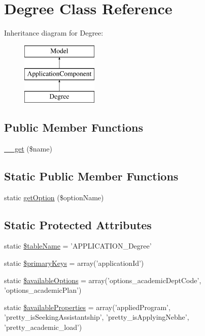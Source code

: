 \hypertarget{class_degree}{\section{Degree Class Reference}
\label{class_degree}
}
Inheritance diagram for Degree\-:\begin{figure}[H]
\begin{center}
\leavevmode
\includegraphics[height=3.000000cm]{class_degree}
\end{center}
\end{figure}
\subsection*{Public Member Functions}
\begin{DoxyCompactItemize}
\item 
\hyperlink{class_degree_af1fa5dd7922d150a2b2a7838c13f507b}{\-\_\-\-\_\-get} (\$name)
\end{DoxyCompactItemize}
\subsection*{Static Public Member Functions}
\begin{DoxyCompactItemize}
\item 
static \hyperlink{class_degree_aec479498d9a728b73ada48a7f0ceee50}{get\-Option} (\$option\-Name)
\end{DoxyCompactItemize}
\subsection*{Static Protected Attributes}
\begin{DoxyCompactItemize}
\item 
static \hyperlink{class_degree_a0b4cb9c53a0caf30457996db3ff090d0}{\$table\-Name} = 'A\-P\-P\-L\-I\-C\-A\-T\-I\-O\-N\-\_\-\-Degree'
\item 
static \hyperlink{class_degree_a81827ba2c94da59780aef2a3f713f065}{\$primary\-Keys} = array('application\-Id')
\item 
static \hyperlink{class_degree_a565c2be7ed24262f732fb04cdb114ce2}{\$available\-Options} = array('options\-\_\-academic\-Dept\-Code', 'options\-\_\-academic\-Plan')
\item 
static \hyperlink{class_degree_afb989882a36e830c21e867bc4a65f9fc}{\$available\-Properties} = array('applied\-Program', 'pretty\-\_\-is\-Seeking\-Assistantship', 'pretty\-\_\-is\-Applying\-Nebhe', 'pretty\-\_\-academic\-\_\-load')
\end{DoxyCompactItemize}
